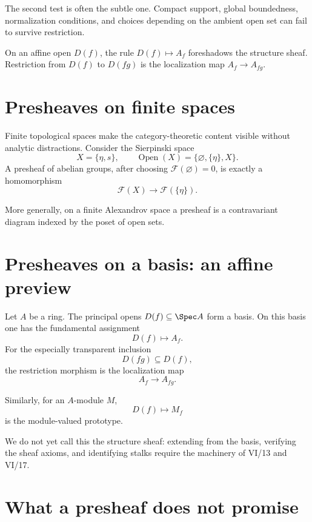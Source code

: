 The second test is often the subtle one.  Compact support, global boundedness, normalization
conditions, and choices depending on the ambient open set can fail to survive restriction.

\begin{example}\label{ex:vi12-expand-03}
On an affine open $D(f)$, the rule $D(f)\mapsto A_f$ foreshadows the structure sheaf.  Restriction from $D(f)$ to $D(fg)$ is the localization map $A_f\to A_{fg}$.
\end{example}
\section{Presheaves on finite spaces}

Finite topological spaces make the category-theoretic content visible without analytic
distractions.  Consider the Sierpinski space
\[
X=\{\eta,s\},
\qquad
\operatorname{Open}(X)=\{\varnothing,\{\eta\},X\}.
\]
A presheaf of abelian groups, after choosing $\mathcal F(\varnothing)=0$, is exactly a
homomorphism
\[
\mathcal F(X)\longrightarrow\mathcal F(\{\eta\}).
\]



More generally, on a finite Alexandrov space a presheaf is a contravariant diagram indexed
by the poset of open sets.

\section{Presheaves on a basis: an affine preview}

Let $A$ be a ring.  The principal opens $D(f)\subseteq\Spec A$ form a basis.  On this basis
one has the fundamental assignment
\[
D(f)\longmapsto A_f.
\]
For the especially transparent inclusion
\[
D(fg)\subseteq D(f),
\]
the restriction morphism is the localization map
\[
A_f\longrightarrow A_{fg}.
\]

Similarly, for an $A$-module $M$,
\[
D(f)\longmapsto M_f
\]
is the module-valued prototype.



We do not yet call this the structure sheaf: extending from the basis, verifying the sheaf
axioms, and identifying stalks require the machinery of VI/13 and VI/17.

\section{What a presheaf does not promise}

